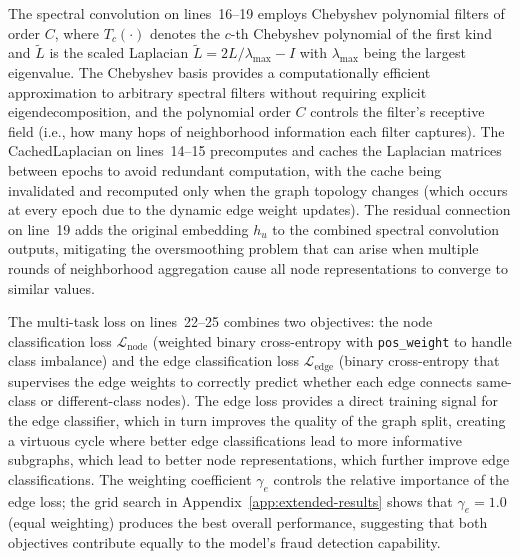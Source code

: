 The spectral convolution on lines~16--19 employs Chebyshev polynomial filters of order $C$, where $T_c(\cdot)$ denotes the $c$-th Chebyshev polynomial of the first kind and $\tilde{L}$ is the scaled Laplacian $\tilde{L} = 2L/\lambda_{\max} - I$ with $\lambda_{\max}$ being the largest eigenvalue. The Chebyshev basis provides a computationally efficient approximation to arbitrary spectral filters without requiring explicit eigendecomposition, and the polynomial order $C$ controls the filter's receptive field (i.e., how many hops of neighborhood information each filter captures). The CachedLaplacian on lines~14--15 precomputes and caches the Laplacian matrices between epochs to avoid redundant computation, with the cache being invalidated and recomputed only when the graph topology changes (which occurs at every epoch due to the dynamic edge weight updates). The residual connection on line~19 adds the original embedding $h_u$ to the combined spectral convolution outputs, mitigating the oversmoothing problem that can arise when multiple rounds of neighborhood aggregation cause all node representations to converge to similar values.

The multi-task loss on lines~22--25 combines two objectives: the node classification loss $\mathcal{L}_{\text{node}}$ (weighted binary cross-entropy with \texttt{pos\_weight} to handle class imbalance) and the edge classification loss $\mathcal{L}_{\text{edge}}$ (binary cross-entropy that supervises the edge weights to correctly predict whether each edge connects same-class or different-class nodes). The edge loss provides a direct training signal for the edge classifier, which in turn improves the quality of the graph split, creating a virtuous cycle where better edge classifications lead to more informative subgraphs, which lead to better node representations, which further improve edge classifications. The weighting coefficient $\gamma_e$ controls the relative importance of the edge loss; the grid search in Appendix~\ref{app:extended-results} shows that $\gamma_e = 1.0$ (equal weighting) produces the best overall performance, suggesting that both objectives contribute equally to the model's fraud detection capability.
